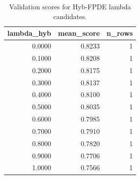 \begin{table}[t]
\caption{Validation scores for Hyb-FPDE lambda candidates.}
\label{tab:lambda_distribution_computed}
\centering
\begin{tabular}{rrr}
\toprule
lambda\_hyb & mean\_score & n\_rows \\
\midrule
0.0000 & 0.8233 & 1 \\
0.1000 & 0.8208 & 1 \\
0.2000 & 0.8175 & 1 \\
0.3000 & 0.8137 & 1 \\
0.4000 & 0.8100 & 1 \\
0.5000 & 0.8035 & 1 \\
0.6000 & 0.7985 & 1 \\
0.7000 & 0.7910 & 1 \\
0.8000 & 0.7820 & 1 \\
0.9000 & 0.7706 & 1 \\
1.0000 & 0.7566 & 1 \\
\bottomrule
\end{tabular}

\end{table}
